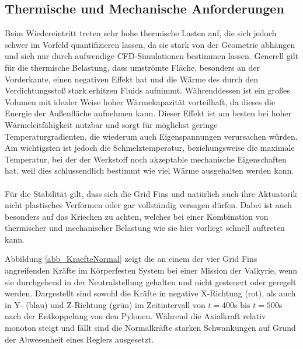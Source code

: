 \subsection{Thermische und Mechanische Anforderungen}\label{sec:MechAnford}
Beim Wiedereintritt treten sehr hohe thermische Lasten auf, die sich jedoch schwer im Vorfeld quantifizieren lassen, da sie stark von der Geometrie abhängen und sich nur durch aufwendige CFD-Simulationen bestimmen lassen. Generell gilt für die thermische Belastung, dass umströmte Fläche, besonders an der Vorderkante, einen negativen Effekt hat und die Wärme des durch den Verdichtungsstoß stark erhitzen Fluids aufnimmt. Währenddessen ist ein großes Volumen mit idealer Weise hoher Wärmekapazität vorteilhaft, da dieses die Energie der Außenfläche aufnehmen kann. Dieser Effekt ist am besten bei hoher Wärmeleitfähigkeit nutzbar und sorgt für möglichst geringe Temperaturgradienten, die wiederum auch Eigenspannungen verursachen würden. Am wichtigsten ist jedoch die Schmelztemperatur, beziehungsweise die maximale Temperatur, bei der der Werkstoff noch akzeptable mechanische Eigenschaften hat, weil dies schlussendlich bestimmt wie viel Wärme ausgehalten werden kann.
\\~\\
Für die Stabilität gilt, dass sich die Grid Fins und natürlich auch ihre Aktuatorik nicht plastisches Verformen oder gar vollständig versagen dürfen. Dabei ist auch besonders auf das Kriechen zu achten, welches bei einer Kombination von thermischer und mechanischer Belastung wie sie hier vorliegt schnell auftreten kann.

Abbildung \ref{abb_KraefteNormal} zeigt die an einem der vier Grid Fins angreifenden Kräfte im Körperfesten System bei einer Mission der Valkyrie, wenn sie durchgehend in der Neutralstellung gehalten und nicht gesteuert oder geregelt werden. Dargestellt sind sowohl die Kräfte in negative X-Richtung (rot), als auch in Y- (blau) und Z-Richtung (grün) im Zeitintervall von $t=400$s bis $t=500$s nach der Entkoppelung von den Pylonen. Während die Axialkraft relativ monoton steigt und fällt sind die Normalkräfte starken Schwankungen auf Grund der Abwesenheit eines Reglers ausgesetzt.

